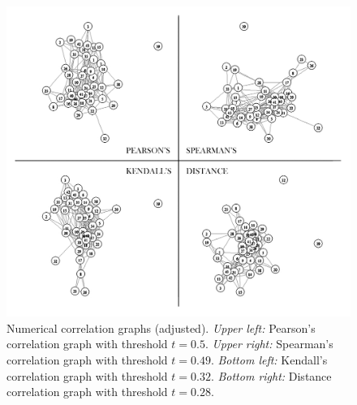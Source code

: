 \begin{figure}[htb]
	\begin{center}
		\includegraphics[width=1\linewidth]
		{ch-usage/figures/numgraphs}
		\caption[Numerical correlation graphs (adjusted).]{Numerical 
		correlation graphs (adjusted). 
		\textit{Upper left:} Pearson's correlation graph with 
		threshold $t = 0.5$. \textit{Upper right:} Spearman's correlation graph 
		with threshold $t = 0.49$. \textit{Bottom left:} Kendall's correlation 
		graph with threshold $t = 0.32$. \textit{Bottom right:} Distance 
		correlation graph with threshold $t = 0.28$.}
		\label{fig:usage:numg}
	\end{center}
\end{figure}

